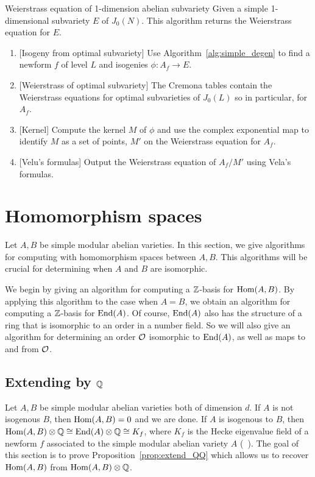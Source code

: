 \begin{algorithm}{Weierstrass equation of 1-dimension abelian subvariety}%
    \label{alg:weierstrass}
    Given a simple 1-dimensional subvariety $E$ of $J_0(N)$. This algorithm
    returns the Weierstrass equation for $E$.
    \begin{enumerate}
        \item{}
            [Isogeny from optimal subvariety] Use
            Algorithm~\ref{alg:simple_degen} to find a newform $f$ of level
            $L$ and isogenies $\phi:A_f\to E$.
        \item{}
            [Weierstrass of optimal subvariety] The Cremona tables contain the
            Weierstrass equations for optimal subvarieties of $J_0(L)$ so in
            particular, for $A_f$.
        \item{}
            [Kernel] Compute the kernel $M$ of $\phi$ and use the complex
            exponential map to identify $M$ as a set of points, $M'$ on the
            Weierstrass equation for $A_f$.
        \item{}
            [Velu's formulas] Output the Weierstrass equation of $A_f/M'$ using
            Vela's formulas.
    \end{enumerate}
\end{algorithm}

\section{Homomorphism spaces}

Let $A, B$ be simple modular abelian varieties. In this section, we give
algorithms for computing with homomorphism spaces between $A, B$. This
algorithms will be crucial for determining when $A$ and $B$ are isomorphic. 

We begin by giving an algorithm for computing a $\mathbb{Z}$-basis for $\operatorname{Hom}(A,B)$.
By applying this algorithm to the case when $A=B$, we obtain an algorithm for
computing a $\mathbb{Z}$-basis for $\operatorname{End}(A)$. Of course, $\operatorname{End}(A)$ also has the
structure of a ring that is isomorphic to an order in a number field. So we
will also give an algorithm for determining an order $\mathcal{O}$ isomorphic to
$\operatorname{End}(A)$, as well as maps to and from $\mathcal{O}$.

\subsection{Extending by $\mathbb{Q}$}%
\label{sub:extending_by_qq_}

Let $A, B$ be simple modular abelian varieties both of dimension $d$. If $A$ is
not isogenous $B$, then $\operatorname{Hom}(A, B)=0$ and we are done. If $A$ is isogenous to
$B$, then $\operatorname{Hom}(A,B)\otimes \mathbb{Q} \cong \operatorname{End}(A)\otimes \mathbb{Q}\cong K_f$, where $K_f$
is the Hecke eigenvalue field of a newform $f$ associated to the simple modular
abelian variety $A$ (~\cite{shimura}). The goal of this section is to prove
Proposition~\ref{prop:extend_QQ} which allows us to recover $\operatorname{Hom}(A,B)$ from
$\operatorname{Hom}(A,B)\otimes \mathbb{Q}$.

